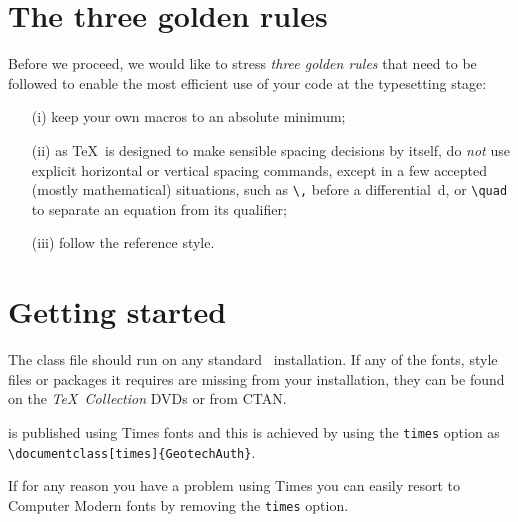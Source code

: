 \documentclass[times]{GeotechAuth}
\begin{document}
\section{The three golden rules}
Before we proceed, we would like to stress \emph{three golden
rules} that need to be followed to enable the most efficient use
of your code at the typesetting stage:
\begin{enumerate}
\item[(i)] keep your own macros to an absolute minimum;

\item[(ii)] as \TeX\ is designed to make sensible spacing
decisions by itself, do \emph{not} use explicit horizontal or
vertical spacing commands, except in a few accepted (mostly
mathematical) situations, such as \verb"\," before a
differential~d, or \verb"\quad" to separate an equation from its
qualifier;

\item[(iii)] follow the \emph{\journalnamelc} reference style.
\end{enumerate}

\section{Getting started} The \textsf{\journalclassshort} class file should run
on any standard \LaTeXe\ installation. If any of the fonts, style
files or packages it requires are missing from your installation,
they can be found on the \emph{\TeX\ Collection} DVDs or from
CTAN.

\emph{\journalnamelc} is published using Times fonts and this is
achieved by using the \verb"times"
option as\\
\verb"\documentclass[times]{GeotechAuth}".

\noindent If for any reason you have a problem using Times you can
easily resort to Computer Modern fonts by removing the
\verb"times" option.
\end{document}
